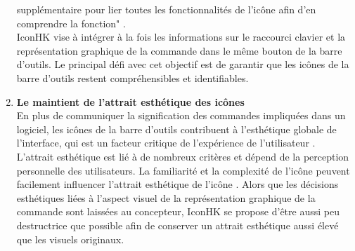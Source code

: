 \documentclass[12pt,a4paper]{article}
\newcommand\tab[1][0.65cm]{\hspace*{#1}}
\begin{document}
\begin{enumerate}
supplémentaire pour lier toutes les fonctionnalités de l'icône afin d’en comprendre la fonction" \cite{14,15}.\\
\tab IconHK vise à intégrer à la fois les informations sur le raccourci clavier et la représentation graphique de la commande dans le même bouton de la barre d'outils. Le principal défi avec cet objectif est de garantir que les icônes de la barre d'outils restent compréhensibles et identifiables.
\item {\large \textbf{Le maintient de l'attrait esthétique des icônes}}\\
En plus de communiquer la signification des commandes impliquées dans un logiciel, les icônes de la barre d'outils contribuent à l'esthétique globale de l'interface, qui est un facteur critique de l'expérience de l'utilisateur \cite{16}. L'attrait esthétique est lié à de nombreux critères et dépend de la perception personnelle des utilisateurs. La familiarité et la complexité de l'icône peuvent facilement
influencer l'attrait esthétique de l'icône \cite{17}. Alors que les décisions esthétiques liées à l'aspect visuel de la représentation graphique de la commande sont laissées au concepteur, IconHK se propose d'être aussi peu destructrice que possible afin de conserver un attrait esthétique aussi élevé que les visuels originaux.
\end{enumerate}
\end{document}
